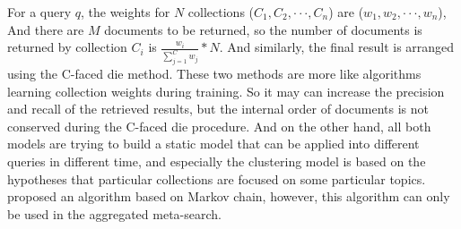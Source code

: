 For a query $q$, the weights for $N$ collections ($C_1,C_2,\cdotp\cdotp\cdotp,C_n$) are ($w_1,w_2,\cdotp\cdotp\cdotp,w_n$), And there are $M$ documents to be returned, so the number of documents is returned by collection $C_i$ is $\frac{w_i}{\sum\limits_{j=1}^C{w_j}}*N$. And similarly, the final result is arranged using the C-faced die method. These two methods are more like algorithms learning collection weights during training. So it may can increase the precision and recall of the retrieved results, but the internal order of documents is not conserved during the C-faced die procedure. And on the other hand, all both models are trying to build a static model that can be applied into different queries in different time, and especially the clustering model is based on the hypotheses that particular collections are focused on some particular topics.
\cite{Dwork2001} proposed an algorithm based on Markov chain, however, this algorithm can only be used in the aggregated meta-search.

